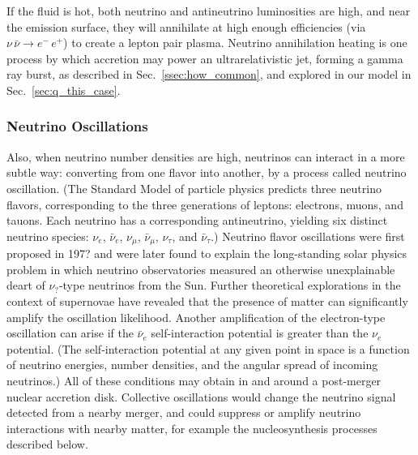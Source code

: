 If the fluid is hot, both neutrino and antineutrino luminosities are high,
and near the emission surface, they will annihilate at high enough efficiencies
(via $\nu\,\bar{\nu}\rightarrow e^{-}\,e^{+}$) to create a lepton pair plasma.
Neutrino annihilation heating is one process by which accretion may
power an ultrarelativistic jet, forming a gamma ray burst, as described in
Sec.~\ref{ssec:how_common}, and explored in our model in
Sec.~\ref{sec:q_this_case}.

\subsubsection{Neutrino Oscillations}
\label{sssc:neutrino_osc}
Also, when neutrino number densities are high,
neutrinos can interact in a more subtle way: converting from one flavor into
another, by a process called neutrino oscillation.
(The Standard Model of particle physics predicts three neutrino flavors,
corresponding to the three generations of leptons: electrons, muons, and tauons.
Each neutrino has a corresponding antineutrino, yielding six distinct neutrino
species: $\nu_e$, $\bar{\nu}_e$, $\nu_\mu$, $\bar{\nu}_\mu$, $\nu_\tau$,
and $\bar{\nu}_\tau$.)
Neutrino flavor oscillations were first proposed in 197?
and were later found to explain the long-standing solar physics problem in which
neutrino observatories measured an otherwise unexplainable deart of $\nu_?$-type
neutrinos from the Sun. Further theoretical explorations in the context of
supernovae have revealed that
the presence of matter can significantly amplify the oscillation likelihood.
Another amplification of the electron-type oscillation can arise if the
$\bar{\nu}_e$ self-interaction potential is greater than the $\nu_e$ potential.
(The self-interaction potential at any given point in space is a function of
neutrino energies, number densities, and the angular spread of incoming
neutrinos.) All of these conditions may obtain in and around a post-merger
nuclear accretion disk. Collective oscillations would change the neutrino
signal detected from a nearby merger, and could suppress or amplify neutrino
interactions with nearby matter, for example the nucleosynthesis processes
described below.

